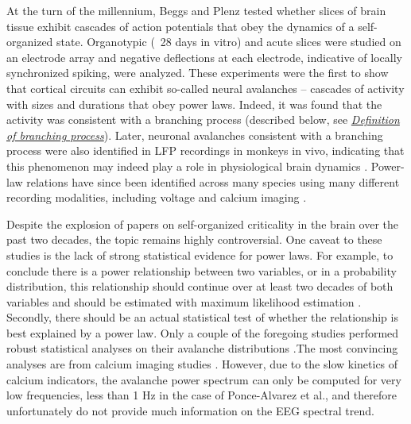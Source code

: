 At the turn of the millennium, Beggs and Plenz \cite{Beggs2003} tested whether slices of brain tissue exhibit cascades of action potentials that obey the dynamics of a self-organized state. Organotypic (~28 days in vitro) and acute slices were studied on an electrode array and negative deflections at each electrode, indicative of locally synchronized spiking, were analyzed. These experiments were the first to show that cortical circuits can exhibit so-called neural avalanches – cascades of activity with sizes and durations that obey power laws. Indeed, it was found that the activity was consistent with a branching process (described below, see \hyperref[sec:branching_prcoess]{\textit{Definition of branching process}}). Later, neuronal avalanches consistent with a branching process were also identified in LFP recordings in monkeys in vivo, indicating that this phenomenon may indeed play a role in physiological brain dynamics \cite{Petermann2009}. Power-law relations have since been identified across many species using many different recording modalities, including voltage \cite{Scott2014} and calcium imaging \cite{Bellay2015,Ponce-Alvarez2018}.

Despite the explosion of papers on self-organized criticality in the brain over the past two decades, the topic remains highly controversial. One caveat to these studies is the lack of strong statistical evidence for power laws. For example, to conclude there is a power relationship between two variables, or in a probability distribution, this relationship should continue over at least two decades of both variables and should be estimated with maximum likelihood estimation \cite{Stumpf2012}. Secondly, there should be an actual statistical test of whether the relationship is best explained by a power law. Only a couple of the foregoing studies performed robust statistical analyses on their avalanche distributions \cite{Clauset2009}.The most convincing analyses are from calcium imaging studies \cite{Bellay2015, Ponce-Alvarez2018}. However, due to the slow kinetics of calcium indicators, the avalanche power spectrum can only be computed for very low frequencies, less than 1 Hz in the case of Ponce-Alvarez et al.\cite{Ponce-Alvarez2018}, and therefore unfortunately do not provide much information on the EEG spectral trend. 

